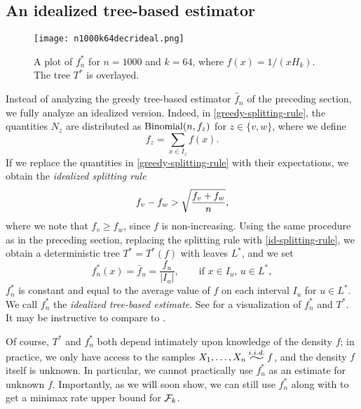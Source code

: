 \subsection{An idealized tree-based estimator}

\begin{figure}
  \centering
  \texttt{[image: n1000k64decrideal.png]}
  \caption{A plot of $f^*_n$ for $n = 1000$ and $k = 64$, where
    $f(x) = 1/(x H_k)$. The tree $T^*$ is overlayed.}
\end{figure}
Instead of analyzing the greedy tree-based estimator $\hat{f}_n$ of
the preceding section, we fully analyze an idealized version.
Indeed, in \eqref{greedy-splitting-rule}, the quantities $N_z$ are
distributed as $\operatorname{Binomial}(n, f_z)$ for $z \in \{v, w\}$, where we define
\[
  f_z = \sum_{x \in I_z} f(x) .
\]
If we replace the quantities in \eqref{greedy-splitting-rule} with
their expectations, we obtain the \emph{idealized splitting rule}
\begin{align}
  f_v - f_w > \sqrt{\frac{f_v + f_w}{n}} , \eqlabel{id-splitting-rule}
\end{align}
where we note that $f_v \ge f_w$, since $f$ is non-increasing. Using
the same procedure as in the preceding section, replacing the
splitting rule with \eqref{id-splitting-rule}, we obtain a
deterministic tree $T^* = T^*(f)$ with leaves $L^*$, and we set
\[
  f^*_n(x) = \bar{f}_u = \frac{f_u}{|I_u|} , \qquad \text{if } x \in I_u, \, u \in L^* ,
\]
\ie $f^*_n$ is constant and equal to the average value of $f$ on each
interval $I_u$ for $u \in L^*$. We call $f^*_n$ the \emph{idealized
  tree-based estimate}. See  for a visualization of
$f^*_n$ and $T^*$. It may be instructive to compare  to
.

Of course, $T^*$ and $f^*_n$ both depend
intimately upon knowledge of the density $f$; in practice, we only
have access to the samples $X_1, \dots, X_n \iid f$, and the density
$f$ itself is unknown. In particular, we cannot practically use
$f^*_n$ as an estimate for unknown $f$. Importantly, as we will soon
show, we can still use $f^*_n$ along with
 to get a minimax rate upper bound for
$\mathcal{F}_k$.

